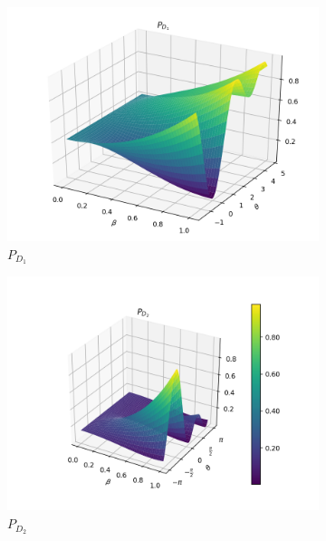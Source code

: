 \documentclass{book}
\begin{document}
\begin{figure}[H]
\centering
\begin{subfigure}[b]{0.30\linewidth}
\includegraphics[width=\linewidth]{images/pd1_3.png}
\caption{$P_{D_{1}}$}
\end{subfigure}
\begin{subfigure}[b]{0.30\linewidth}
\includegraphics[width=\linewidth]{images/pd2_3.png}
\caption{$P_{D_{2}}$ }
\label{fig:BS1}
\end{subfigure}
\begin{subfigure}[b]{0.30\linewidth}

\end{subfigure}
\end{figure}
\end{document}
